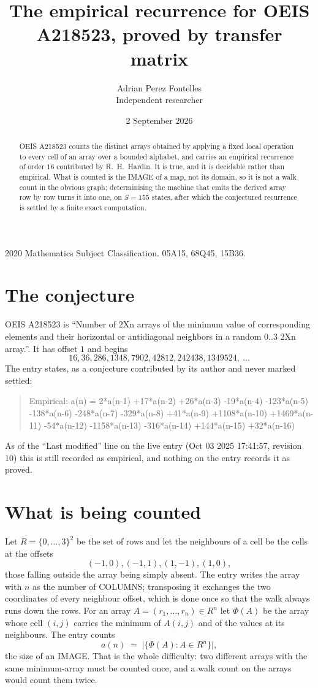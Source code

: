 \documentclass[11pt,a4paper]{article}
\title{The empirical recurrence for OEIS A218523, proved by transfer matrix}
\author{Adrian Perez Fontelles\\ \small Independent researcher}
\date{2 September 2026}
\theoremstyle{plain}
\theoremstyle{definition}
\begin{document}
\maketitle

\begin{abstract}
OEIS A218523 counts the distinct arrays obtained by applying a fixed local operation to every cell
of an array over a bounded alphabet, and carries an empirical recurrence of order $16$
contributed by R.~H.~Hardin. It is true, and it is decidable rather than empirical. What is
counted is the IMAGE of a map, not its domain, so it is not a walk count in the obvious graph;
determinising the machine that emits the derived array row by row turns it into one, on
$S=155$ states, after which the conjectured recurrence is settled by a finite exact
computation.
\end{abstract}

\noindent\small 2020 Mathematics Subject Classification. 05A15, 68Q45, 15B36.\normalsize

\section{The conjecture}

OEIS A218523 is ``Number of 2Xn arrays of the minimum value of corresponding elements and their horizontal or antidiagonal neighbors in a random 0..3 2Xn array.''. It has offset $1$ and begins
\[
16, 36, 286, 1348, 7902, 42812, 242438, 1349524,\ \dots
\]
The entry states, as a conjecture contributed by its author and never marked settled:
\begin{quote}
Empirical: a(n) = 2*a(n-1) +17*a(n-2) +26*a(n-3) -19*a(n-4) -123*a(n-5) -138*a(n-6) -248*a(n-7) -329*a(n-8) +41*a(n-9) +1108*a(n-10) +1469*a(n-11) -54*a(n-12) -1158*a(n-13) -316*a(n-14) +144*a(n-15) +32*a(n-16)
\end{quote}
As of the ``Last modified'' line on the live entry (Oct 03 2025 17:41:57, revision 10) this is still
recorded as empirical, and nothing on the entry records it as proved.

\section{What is being counted}

Let $R=\{0,\dots,3\}^{2}$ be the set of rows and let the neighbours of
a cell be the cells at the offsets
\[
(-1,0), (-1,1), (1,-1), (1,0),
\]
those falling outside the array being simply absent. The entry writes the array with $n$ as the number of COLUMNS; transposing it exchanges the two coordinates of every neighbour offset, which is done once so that the walk always runs down the rows. For an array
$A=(r_1,\dots,r_n)\in R^n$ let $\Phi(A)$ be the array whose cell $(i,j)$ carries the
minimum of $A(i,j)$ and of the values at its neighbours. The entry counts
\[
a(n)\;=\;\bigl|\{\Phi(A):A\in R^n\}\bigr| ,
\]
the size of an IMAGE. That is the whole difficulty: two different arrays with the same
minimum-array must be counted once, and a walk count on the arrays would count them twice.
\end{document}
